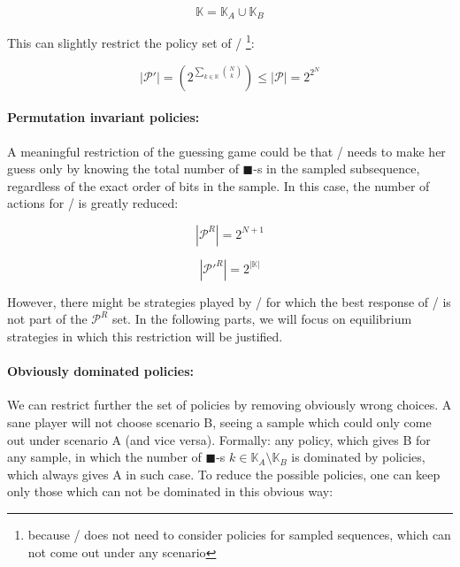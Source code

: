 \documentclass{article}
\newcommand{\bb}{\blacksquare}
\theoremstyle{definition}
\begin{document}
\begin{equation}
    \mathbb{K} = \mathbb{K}_A \cup \mathbb{K}_B
\end{equation}

This can slightly restrict the policy set of \PI/ \footnote{because \PI/ does not need to consider policies for sampled sequences, which can not come out under any scenario}:

\begin{equation}
        |\mathcal{P}'| = \left (  2^{\sum_{k \in \mathbb{K}} \binom{N}{k}} \right ) \le |\mathcal{P}| = 2^{2^N}
\end{equation}

\paragraph{Permutation invariant policies:}

A meaningful restriction of the guessing game could be that \PI/ needs to make her guess only by knowing the total number of $\bb$-s in the sampled subsequence, regardless of the exact order of bits in the sample. In this case, the number of actions for \PI/ is greatly reduced:

\begin{equation}
    |\mathcal{P}^R| = 2^{N+1}
\end{equation}

\begin{equation}
    |\mathcal{P'}^R| = 2^{|\mathbb{K}|}
\end{equation}

However, there might be strategies played by \PII/ for which the best response of \PI/ is not part of the $\mathcal{P}^R$ set.
In the following parts, we will focus on equilibrium strategies in which this restriction will be justified.

\paragraph{Obviously dominated policies:}

We can restrict further the set of policies by removing obviously wrong choices.
A sane player will not choose scenario B, seeing a sample which could only come out under scenario A (and vice versa).
Formally: any policy, which gives B for any sample, in which the number of $\bb$-s $k \in \mathbb{K}_A \setminus \mathbb{K}_B$ is dominated by policies, which always gives A in such case.
To reduce the possible policies, one can keep only those which can not be dominated in this obvious way:
\end{document}
